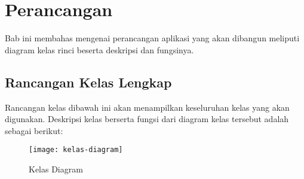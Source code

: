 \chapter{Perancangan}
\label{sec:perancangan}

Bab ini membahas mengenai perancangan aplikasi yang akan dibangun meliputi diagram kelas rinci beserta deskripsi dan fungsinya.

\section{Rancangan Kelas Lengkap}
\label{sec:kelaslengkap}
Rancangan kelas dibawah ini akan menampilkan keseluruhan kelas yang akan digunakan. Deskripsi kelas berserta fungsi dari diagram kelas tersebut adalah sebagai berikut:

\begin{figure}[H]
	\centering  
	\texttt{[image: kelas-diagram]}  
	\caption[Kelas Diagram]{Kelas Diagram} 
	\label{fig:kelas-diagram} 
\end{figure}

